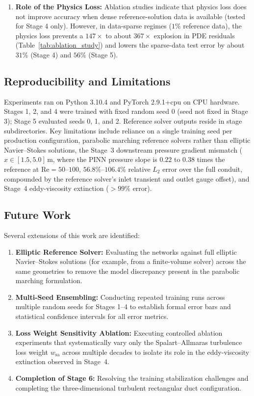 \documentclass[11pt,a4paper]{article}
\begin{document}
\begin{enumerate}[leftmargin=1.5em]
    \item \textbf{Role of the Physics Loss:} Ablation studies indicate that physics loss does not improve accuracy when dense reference-solution data is available (tested for Stage 4 only). However, in data-sparse regimes ($1\%$ reference data), the physics loss prevents a $147\times$ to about $367\times$ explosion in PDE residuals (Table~\ref{tab:ablation_study}) and lowers the sparse-data test error by about $31\%$ (Stage 4) and $56\%$ (Stage 5).
\end{enumerate}

\subsection{Reproducibility and Limitations}
Experiments ran on Python 3.10.4 and PyTorch 2.9.1+cpu on CPU hardware. Stages 1, 2, and 4 were trained with fixed random seed 0 (seed not fixed in Stage 3); Stage 5 evaluated seeds 0, 1, and 2. Reference solver outputs reside in stage  subdirectories. Key limitations include reliance on a single training seed per production configuration, parabolic marching reference solvers rather than elliptic Navier--Stokes solutions, the Stage~3 downstream pressure gradient mismatch ($x \in [1.5, 5.0]\,\text{m}$, where the PINN pressure slope is $0.22$ to $0.38$ times the reference at $\mathrm{Re}=50$--$100$, $56.8\%$--$106.4\%$ relative $L_2$ error over the full conduit, compounded by the reference solver's inlet transient and outlet gauge offset), and Stage~4 eddy-viscosity extinction ($>99\%$ error).

\subsection{Future Work}
\label{sec:future}
Several extensions of this work are identified:
\begin{enumerate}[leftmargin=1.5em]
    \item \textbf{Elliptic Reference Solver:} Evaluating the networks against full elliptic Navier--Stokes solutions (for example, from a finite-volume solver) across the same geometries to remove the model discrepancy present in the parabolic marching formulation.
    \item \textbf{Multi-Seed Ensembling:} Conducting repeated training runs across multiple random seeds for Stages 1--4 to establish formal error bars and statistical confidence intervals for all error metrics.
    \item \textbf{Loss Weight Sensitivity Ablation:} Executing controlled ablation experiments that systematically vary only the Spalart--Allmaras turbulence loss weight $w_{\mathrm{sa}}$ across multiple decades to isolate its role in the eddy-viscosity extinction observed in Stage~4.
    \item \textbf{Completion of Stage 6:} Resolving the training stabilization challenges and completing the three-dimensional turbulent rectangular duct configuration.
\end{enumerate}
\end{document}
